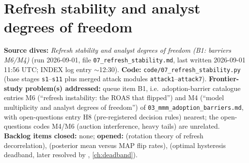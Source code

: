 \chapter{Refresh stability and analyst degrees of freedom}
\label{ch:refresh}

\begin{provenance}
\textbf{Source dives:}  \emph{Refresh stability and analyst degrees of freedom (B1: barriers M6/M4)} (run 2026-09-01, file \texttt{07\_refresh\_stability.md}, last written 2026-09-01 11:56 UTC; INDEX log entry $\sim$12:30).
\textbf{Code:} \texttt{code/07\_refresh\_stability.py} (base stages \texttt{s1}--\texttt{s11} plus merged attack modules \texttt{attack1}--\texttt{attack7}).
\textbf{Frontier-study problem(s) addressed:} queue item B1, i.e.\ adoption-barrier catalogue entries M6 (``refresh instability: the ROAS that flipped'') and M4 (``model multiplicity and analyst degrees of freedom'') of \texttt{03\_mmm\_adoption\_barriers.md}, with open-questions entry H8 (pre-registered decision rules) nearest; the open-questions codes M4/M6 (auction interference, heavy tails) are unrelated.
\textbf{Backlog items closed:} none; \textbf{opened:}  (rotation theory of refresh decorrelation),  (posterior mean versus MAP flip rates),  (optimal hysteresis deadband, later resolved by , \cref{ch:deadband}).
\end{provenance}

